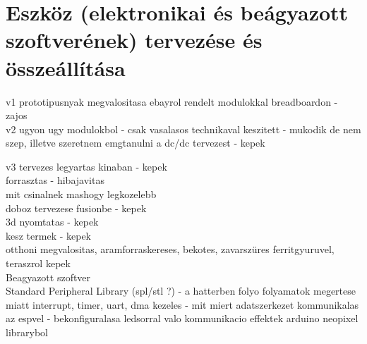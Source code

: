 \documentclass[../main.tex]{subfiles}
\begin{document}
\section{Eszköz (elektronikai és beágyazott szoftverének) tervezése és összeállítása}

v1 prototipusnyak megvalositasa ebayrol rendelt modulokkal breadboardon - zajos\\

v2 ugyon ugy modulokbol - csak vasalasos technikaval keszitett - mukodik de nem szep, illetve szeretnem emgtanulni a dc/dc tervezest - kepek\

v3 tervezes legyartas kinaban - kepek\\ 

forrasztas - hibajavitas\\
mit csinalnek mashogy legkozelebb\\

doboz tervezese fusionbe - kepek\\
3d nyomtatas - kepek\\
kesz termek - kepek\\

otthoni megvalositas, aramforraskereses, bekotes, zavarszüres ferritgyuruvel, teraszrol kepek\\

Beagyazott szoftver\\
Standard Peripheral Library (spl/stl ?) - a hatterben folyo folyamatok megertese miatt
interrupt, timer, uart, dma kezeles - mit miert
adatszerkezet
kommunikalas az espvel - bekonfiguralasa
ledsorral valo kommunikacio
effektek arduino neopixel librarybol 
\end{document}
